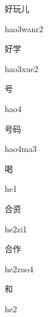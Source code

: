 \begin{verbete}{好玩儿}
\begin{pronuncia}{hao3wanr2}
\end{pronuncia}
\end{verbete}

\begin{verbete}{好学}
\begin{pronuncia}{hao3xue2}
\end{pronuncia}
\end{verbete}

\begin{verbete}[hao4]{号}
\begin{pronuncia}{hao4}
\end{pronuncia}
\end{verbete}

\begin{verbete}[hao4ma3]{号码}
\begin{pronuncia}{hao4ma3}
\end{pronuncia}
\end{verbete}

\begin{verbete}[he1]{喝}
\begin{pronuncia}{he1}
\end{pronuncia}
\end{verbete}

\begin{verbete}[he2zi1]{合资}
\begin{pronuncia}{he2zi1}
\end{pronuncia}
\end{verbete}

\begin{verbete}[he2zuo4]{合作}
\begin{pronuncia}{he2zuo4}
\end{pronuncia}
\end{verbete}

\begin{verbete}[he2]{和}
\begin{pronuncia}{he2}
\end{pronuncia}
\end{verbete}

